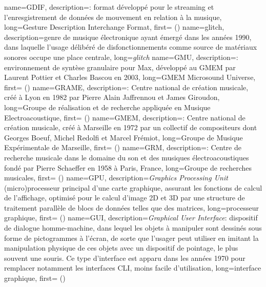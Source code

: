 {
    name={GDIF},
    description={\textit{}: format développé pour le streaming et l'enresgistrement de données de mouvement en relation à la musique},
    long={Gesture Description Interchange Format},
    first={ ()}
}
{
    name={glitch},
    description={genre de musique électronique ayant émergé dans les années 1990, dans laquelle l'usage délibéré de disfonctionnements comme source de matériaux sonores occupe une place centrale},
    long={\textit{glitch}}
}
{
    name={GMU},
    description={\textit{}: environnement de syntèse granulaire pour Max, développé au \gls{GMEM} par Laurent Pottier et Charles Bascou en 2003},
    long={GMEM Microsound Universe},
    first={ ()}
}
{
    name={GRAME},
    description={\textit{}: Centre national de création musicale, créé à Lyon en 1982 par Pierre Alain Jaffrennou et James Giroudon},
    long={Groupe de réalisation et de recherche appliquée en Musique Electroacoustique},
    first={ ()}
}
{
    name={GMEM},
    description={\textit{}: Centre national de création musicale, créé à Marseille en 1972 par un collectif de compositeurs dont Georges Boeuf, Michel Redolfi et Marcel Frémiot},
    long={Groupe de Musique Expérimentale de Marseille},
    first={ ()}
}
{
    name={GRM},
    description={\textit{}: Centre de recherche musicale dans le domaine du son et des musiques électroacoustiques fondé par Pierre Schaeffer en 1958 à Paris, France},
    long={Groupe de recherches musicales},
    first={ ()}
}
{
    name={GPU},
    description={\textit{Graphics Processing Unit} (micro)processeur principal d'une carte graphique, assurant les fonctions de calcul de l'affichage, optimisé pour le calcul d'image 2D et 3D par une structure de traitement parallèle de blocs de données telles que des matrices},
    long={processeur graphique},
    first={ ()}
}
{
    name={GUI},
    description={\textit{Graphical User Interface}: dispositif de dialogue homme-machine, dans lequel les objets à manipuler sont dessinés sous forme de pictogrammes à l'écran, de sorte que l'usager peut utiliser en imitant la manipulation physique de ces objets avec un dispositif de pointage, le plus souvent une souris. Ce type d'interface est apparu dans les années 1970 pour remplacer notamment les interfaces \gls{CLI}, moins facile d'utilisation},
    long={interface graphique},
    first={ ()}
}
